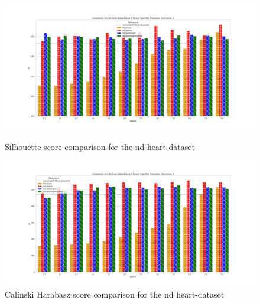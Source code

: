 \begin{figure}[H]
    \centering
    \begin{minipage}[c]{0.8\textwidth}
        \includegraphics[width=1\textwidth]{Results/RQ2-nd/heart-dataset/sc_heart-dataset_comparison.png}
        \caption{Silhouette score comparison for the nd heart-dataset}
        \label{fig:appendix-sc_heart-dataset_comparison_nd}
    \end{minipage}
    \begin{minipage}[c]{0.8\textwidth}
        \includegraphics[width=1\textwidth]{Results/RQ2-nd/heart-dataset/ch_heart-dataset_comparison.png}
        \caption{Calinski Harabasz score comparison for the nd heart-dataset}
        \label{fig:appendix-ch_heart-dataset_comparison_nd}
    \end{minipage}

\end{figure}
